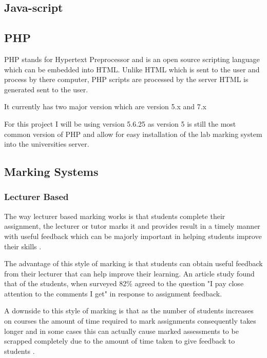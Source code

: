 \documentclass[12pt]{article}  %
\begin{document}
\subsection{Java-script}

\subsection{PHP}

PHP stands for Hypertext Preprocessor and is an open source scripting language which can be embedded into HTML. Unlike HTML which is sent to the user and process by there computer, PHP scripts are processed by the server HTML is generated sent to the user. 

It currently has two major version which are version 5.x and 7.x


For this project I will be using version 5.6.25 as version 5 is still the most common version of PHP and allow for easy installation of the lab marking system into the universities server.



\subsection{Marking Systems}

\subsubsection{Lecturer Based}
The way lecturer based marking works is that students complete their assignment, the lecturer or tutor marks it and provides result in a timely manner with useful feedback which can be majorly important in helping students improve their skills  \cite{tang_investigating_2011}.

The advantage of this style of marking is that students can obtain useful feedback from their lecturer that can help improve their learning.  An article study \cite{higgins_conscientious_2002} found that of the students, when surveyed 82\% agreed to the question "I pay close attention to the comments I get" in response to assignment feedback.

A downside to this style of marking is that as the number of students increases on courses the amount of time required to mark assignments consequently takes longer and in some cases this can actually cause marked assessments to be scrapped completely due to the amount of time taken to give feedback to students \cite{brown_assessment_1999}.
\end{document}
